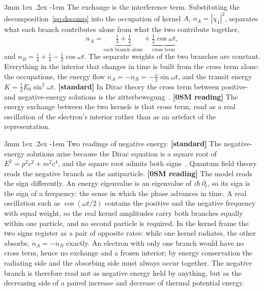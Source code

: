 \documentclass[%
 reprint, amsmath,amssymb, aps, prb, ]{revtex4-2}
\makeatletter
\numberwithin{equation}{section}
\renewcommand\paragraph{%
  \@startsection{paragraph}{4}{\z@}%
    {3mm \@plus 1ex \@minus .2ex}
    {-1em}
    {\normalfont\normalsize\itshape}}
\makeatother
\begin{document}
\paragraph{The exchange is the interference term.} Substituting the decomposition~\eqref{eq:decomp} into the occupation of kernel $A$, $n_A=|\chi_1|^2$, separates what each branch contributes alone from what the two contribute together,
\begin{equation}
n_A=\underbrace{\tfrac14+\tfrac14}_{\text{each branch alone}}+\underbrace{\tfrac12\cos\omega t}_{\text{cross term}},
\label{eq:interf}
\end{equation}
and $n_B=\tfrac14+\tfrac14-\tfrac12\cos\omega t$. The separate weights of the two branches are constant. Everything in the interior that changes in time is built from the cross term alone: the occupations, the energy flow $\dot n_A=-\dot n_B=-\tfrac{\omega}{2}\sin\omega t$, and the transit energy $K=\tfrac12E_0\sin^2\omega t$. \textbf{[standard]} In Dirac theory the cross term between positive- and negative-energy solutions is the zitterbewegung~\cite{ref:schrodinger,ref:thaller}. \textbf{[0SM reading]} The energy exchange between the two kernels is that cross term, read as a real oscillation of the electron's interior rather than as an artefact of the representation.

\paragraph{Two readings of negative energy.} \textbf{[standard]} The negative-energy solutions arise because the Dirac equation is a square root of $E^2=p^2c^2+m^2c^4$, and the square root admits both signs~\cite{ref:dirac28}. Quantum field theory reads the negative branch as the antiparticle. \textbf{[0SM reading]} The model reads the sign differently. An energy eigenvalue is an eigenvalue of $i\hbar\,\partial_t$, so its sign is the sign of a frequency: the sense in which the phase advances in time. A real oscillation such as $\cos(\omega t/2)$ contains the positive and the negative frequency with equal weight, so the real kernel amplitudes carry both branches equally within one particle, and no second particle is required. In the kernel frame the two signs register as a pair of opposite rates: while one kernel radiates, the other absorbs, $\dot n_A=-\dot n_B$ exactly. An electron with only one branch would have no cross term, hence no exchange and a frozen interior; by energy conservation the radiating side and the absorbing side must always occur together. The negative branch is therefore read not as negative energy held by anything, but as the decreasing side of a paired increase and decrease of thermal potential energy.
\end{document}
